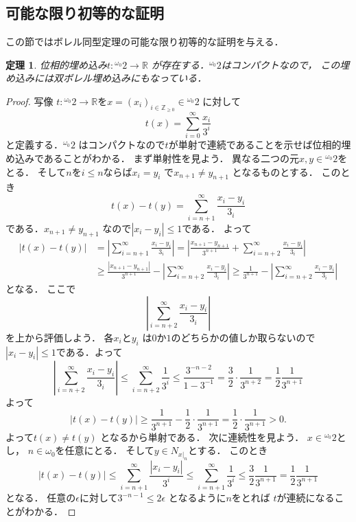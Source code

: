 \documentclass[leqno, 12pt]{jsarticle}
\newtheorem{thm}{定理}
\newcommand{\zz}{\mathbb{Z}}
\newcommand{\rr}{\mathbb{R}}
\newcommand{\myomega}{\omega_{0}}
\newcommand{\mycantor}{{}^{\myomega}2}
\newcommand{\mynbd}[1]{N_{#1}}
\begin{document}
\subsection{可能な限り初等的な証明}\label{sec:ele}
この節ではボレル同型定理の可能な限り初等的な証明を与える．
\begin{thm}\label{thm:ctor}
位相的埋め込み$t\colon \mycantor \to \rr$
が存在する．$\mycantor$はコンパクトなので，
この埋め込みには双ボレル埋め込みにもなっている．
\end{thm}
\begin{proof}
写像
$t\colon \mycantor\to \rr$を$x=(x_{i})_{i\in \zz_{\ge 0}}\in \mycantor$
に対して
\[
t(x)=\sum_{i=0}^{\infty}\frac{x_{i}}{3^{i}}
\]
と定義する．$\mycantor$
はコンパクトなので$t$が単射で連続であることを示せば位相的埋め込みであることがわかる．
まず単射性を見よう．
異なる二つの元$x, y\in \mycantor$をとる．
そして$n$を$i\le n$ならば$x_{i}=y_{i}$
で$x_{n+1}\neq y_{n+1}$
となるものとする．
このとき
\[
t(x)-t(y)=\sum_{i=n+1}^{\infty}\frac{x_{i}-y_{i}}{3_{i}}
\]
である．$x_{n+1}\neq y_{n+1}$
なので$|x_{i}-y_{i}|\le 1$である．
よって
\begin{align*}
|t(x)-t(y)|&=\left|\sum_{i=n+1}^{\infty}\frac{x_{i}-y_{i}}{3_{i}}\right|
=\left|\frac{x_{n+1}-y_{n+1}}{3^{n+1}}+
\sum_{i=n+2}^{\infty}\frac{x_{i}-y_{i}}{3_{i}}
\right|\\
&\ge \frac{|x_{n+1}-y_{n+1}|}{3^{n+1}}
-
\left|
\sum_{i=n+2}^{\infty}\frac{x_{i}-y_{i}}{3_{i}}
\right|
\ge \frac{1}{3^{n+1}}
-\left|
\sum_{i=n+2}^{\infty}\frac{x_{i}-y_{i}}{3_{i}}
\right|
\end{align*}
となる．
ここで
\[
\left|
\sum_{i=n+2}^{\infty}\frac{x_{i}-y_{i}}{3_{i}}
\right|
\]
を上から評価しよう．
各$x_{i}$と$y_{i}$
は$0$か$1$のどちらかの値しか取らないので
$|x_{i}-y_{i}|\le 1$である．よって
\[
\left|
\sum_{i=n+2}^{\infty}\frac{x_{i}-y_{i}}{3_{i}}
\right|
\le 
\sum_{i=n+2}^{\infty}\frac{1}{3^{i}}
\le \frac{3^{-n-2}}{1-3^{-1}}
=\frac{3}{2}\cdot \frac{1}{3^{n+2}}=\frac{1}{2}\frac{1}{3^{n+1}}
\]
よって
\[
|t(x)-t(y)|
\ge
\frac{1}{3^{n+1}}-\frac{1}{2}\cdot \frac{1}{3^{n+1}}
=\frac{1}{2}\cdot \frac{1}{3^{n+1}}>0. 
\]
よって$t(x)\neq t(y)$
となるから単射である．
次に連続性を見よう．
$x\in \mycantor$とし，
$n\in \myomega$を任意にとる．
そして$y\in \mynbd{x|_{n}}$とする．
このとき
\[
|t(x)-t(y)|
\le 
\sum_{i=n+1}^{\infty}\frac{|x_{i}-y_{i}|}{3^{i}}
\le \sum_{i=n+1}^{\infty}\frac{1}{3^{i}}
\le \frac{3}{2}\frac{1}{3^{n+1}}
=\frac{1}{2}\frac{1}{3^{n+1}}
\]
となる．
任意の$\epsilon$に対して$3^{-n-1}\le 2\epsilon$
となるように$n$をとれば
$t$が連続になることがわかる．
\end{proof}
\end{document}
